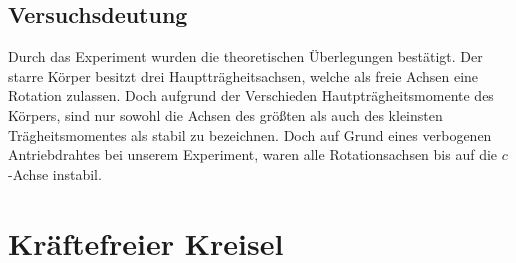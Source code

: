 \documentclass{include/protokollclass}
\begin{document}
    \section{Versuchsdeutung}
    Durch das Experiment wurden die theoretischen Überlegungen bestätigt. Der starre Körper besitzt drei Hauptträgheitsachsen, welche als freie Achsen eine Rotation zulassen. Doch aufgrund der Verschieden Hautpträgheitsmomente des Körpers, sind nur sowohl die Achsen des größten als auch des kleinsten Trägheitsmomentes als stabil zu bezeichnen. Doch auf Grund eines verbogenen Antriebdrahtes bei unserem Experiment, waren alle Rotationsachsen bis auf die $c$-Achse instabil. 
    
    \chapter{Kräftefreier Kreisel}
    
\end{document}
